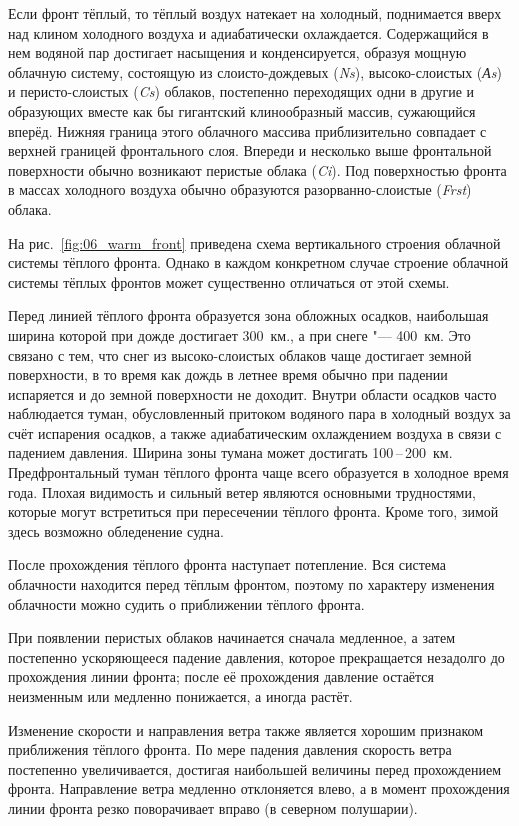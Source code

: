 \documentclass[a4paper, 12pt, twoside, final, book, russian, fittopage, cyremdash, openright]{ncc}
\newcommand{\otdo}{\,--\,}
\begin{document}
Если фронт тёплый, то тёплый воздух натекает на холодный, поднимается
вверх над клином холодного воздуха и адиабатически
охлаждается. Содержащийся в нем водяной пар достигает насыщения и
конденсируется, образуя мощную облачную систему, состоящую из
слоисто-дождевых (\textit{Ns}), высоко-слоистых (\textit{Аs}) и
перисто-слоистых (\textit{Cs}) облаков, постепенно переходящих одни в
другие и образующих вместе как бы гигантский клинообразный массив,
сужающийся вперёд. Нижняя граница этого облачного массива
приблизительно совпадает с верхней границей фронтального слоя. Впереди
и несколько выше фронтальной поверхности обычно возникают перистые
облака (\textit{Ci}). Под поверхностью фронта в массах холодного
воздуха обычно образуются разорванно-слоистые (\textit{Frst}) облака.

На рис.~\ref{fig:06_warm_front} приведена схема вертикального строения
облачной системы тёплого фронта. Однако в каждом конкретном случае
строение облачной системы тёплых фронтов может существенно отличаться
от этой схемы.

Перед линией тёплого фронта образуется зона обложных
осадков, наибольшая ширина которой при
дожде достигает 300~км., а при снеге "--- 400~км. Это связано с тем,
что снег из высоко-слоистых облаков чаще достигает земной поверхности,
в то время как дождь в летнее время обычно при падении испаряется и до
земной поверхности не доходит. Внутри области осадков часто
наблюдается туман, обусловленный притоком водяного пара в холодный
воздух за счёт испарения осадков, а также адиабатическим охлаждением
воздуха в связи с падением давления. Ширина зоны тумана может
достигать 100\otdo200~км. Предфронтальный туман тёплого фронта чаще
всего образуется в холодное время года. Плохая видимость и сильный
ветер являются основными трудностями, которые могут встретиться при
пересечении тёплого фронта. Кроме того, зимой здесь возможно
обледенение судна.

После прохождения тёплого фронта наступает потепление. Вся система
облачности находится перед тёплым фронтом, поэтому по характеру
изменения облачности можно судить о приближении тёплого фронта.

При появлении перистых облаков начинается сначала медленное, а затем
постепенно ускоряющееся падение давления, которое прекращается
незадолго до прохождения линии фронта; после её прохождения давление
остаётся неизменным или медленно понижается, а иногда растёт.

Изменение скорости и направления ветра также является хорошим
признаком приближения тёплого фронта. По мере падения давления
скорость ветра постепенно увеличивается, достигая наибольшей величины
перед прохождением фронта. Направление ветра медленно отклоняется
влево, а в момент прохождения линии фронта резко поворачивает вправо
(в северном полушарии).
\end{document}
